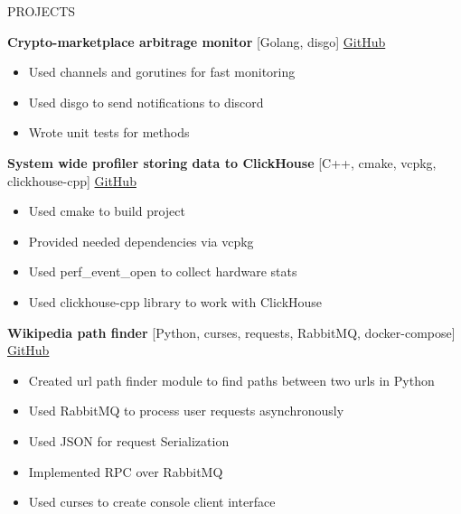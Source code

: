 \documentclass{resume} %
\begin{document}
\begin{rSection}{PROJECTS}
    \vspace{-1.25em}
    \item \textbf{Crypto-marketplace arbitrage monitor} {[Golang, disgo]} \hfill \href{https://github.com/rubin-do/crypto-monitors}{GitHub}
    \begin{itemize}
        \itemsep -3pt {} 
        \item Used channels and gorutines for fast monitoring
        \item Used disgo to send notifications to discord
        \item Wrote unit tests for methods
    \end{itemize}
    \item \textbf{System wide profiler storing data to ClickHouse} {[C++, cmake, vcpkg, clickhouse-cpp]} \hfill \href{https://github.com/rubin-do/clickhouse-perf-profiler}{GitHub}
    \begin{itemize}
        \itemsep -3pt {} 
        \item Used cmake to build project
        \item Provided needed dependencies via vcpkg
        \item Used perf\_event\_open to collect hardware stats
        \item Used clickhouse-cpp library to work with ClickHouse
    \end{itemize}
    \item \textbf{Wikipedia path finder} {[Python, curses, requests, RabbitMQ, docker-compose]} \hfill \href{https://github.com/rubin-do/wiki-path-finder}{GitHub}
    \begin{itemize}
        \itemsep -3pt {} 
        \item Created url path finder module to find paths between two urls in Python
        \item Used RabbitMQ to process user requests asynchronously
        \item Used JSON for request Serialization
        \item Implemented RPC over RabbitMQ
        \item Used curses to create console client interface
    \end{itemize}
    \end{rSection} 
\end{document}
